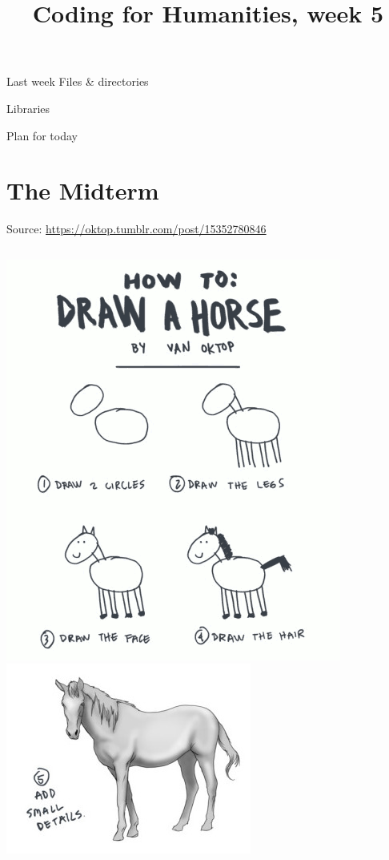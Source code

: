 \documentclass[aspectratio=169,usenames,dvipsnames]{beamer}
\title{Coding for Humanities, week 5}
\begin{document}
\begin{frame}
 \titlepage
\end{frame}

\begin{frame}{Last week}
    Files \& directories

    Libraries
\end{frame}

\begin{frame}{Plan for today}
 \tableofcontents
\end{frame}

\section{The Midterm}
\begin{frame}
    \begin{reference}
        \hfill Source: \url{https://oktop.tumblr.com/post/15352780846}
    \end{reference}
    \begin{columns}[b]
            \includegraphics[height=0.9\textheight]{fig/horse1}
        \pause
            \includegraphics[width=0.9\linewidth]{fig/horse2}

\end{columns}
\end{frame}
\end{document}
